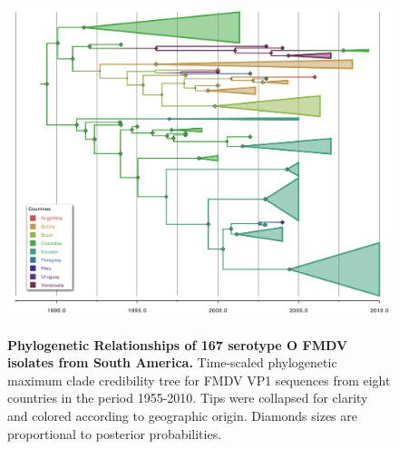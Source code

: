 \documentclass[10pt]{article}
\begin{document}
\begin{figure}[!ht]
\begin{center}
\includegraphics[width=15cm,height=10cm]{FIGURES/O.pdf}
\end{center}
\caption{
{\bf Phylogenetic Relationships of 167 serotype O FMDV isolates from South America.} Time-scaled phylogenetic maximum clade credibility tree for FMDV VP1 sequences from eight countries in the period 1955-2010. Tips were collapsed for clarity and colored according to geographic origin. Diamonds sizes are proportional to posterior probabilities.\\
}
\label{fig:Otree}
\end{figure}
\newpage
\end{document}
